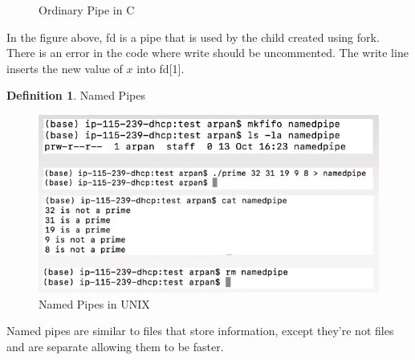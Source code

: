 \documentclass[a4paper]{article}
\theoremstyle{plain}
\theoremstyle{definition}
\newtheorem{defn}{Definition}[section]
\newtheorem{exmp}{Example}[section]
\theoremstyle{remark}
\begin{document}
\begin{tcolorbox}[colback=black!3!white,colframe=black!60!white,title=\begin{exmp}Examples of IPC \label{Examples of IPC}\end{exmp}, breakable, enhanced]
\begin{figure}[H]
	\caption{Ordinary Pipe in C}
	\label{fig:fourteen-png}
\end{figure}
In the figure above, fd is a pipe that is used by the child created using fork. There is an error in the code where write should be uncommented. The write line inserts the new value of $x$ into fd[1].
\begin{defn}
	Named Pipes
\end{defn}
\begin{figure}[H]
	\centering
	\includegraphics[width=1\textwidth]{fifteen.png}
	\caption{Named Pipes in UNIX}
	\label{fig:fifteen-png}
\end{figure}
Named pipes are similar to files that store information, except they're not files and are separate allowing them to be faster.
\end{tcolorbox}
\end{document}
